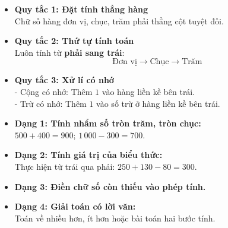 \documentclass[10pt,a4paper]{article}
\begin{document}
\noindent
\begin{minipage}[t]{0.49\textwidth}\vspace{0pt}
\begin{tcolorbox}[
  enhanced,
  colback=violet!4!white,
  colframe=violet!75!black,
  arc=2mm, boxrule=0.8pt,
  left=2mm, right=2mm, top=1.8mm, bottom=1.8mm,
  title={\footnotesize\bfseries\color{white}\faKey\ 1. Bảng quy tắc tính toán chuẩn mực}
]
{\footnotesize
\begin{itemize}\setlength{\itemsep}{1pt}\setlength{\leftskip}{-2.5mm}
  \item \textbf{Quy tắc 1: Đặt tính thẳng hàng}\\
  Chữ số hàng đơn vị, chục, trăm phải thẳng cột tuyệt đối.
  \item \textbf{Quy tắc 2: Thứ tự tính toán}\\
  Luôn tính từ \textbf{phải sang trái}:
  $$\text{Đơn vị} \longrightarrow \text{Chục} \longrightarrow \text{Trăm}$$
  \item \textbf{Quy tắc 3: Xử lí có nhớ}\\
  - Cộng có nhớ: Thêm $1$ vào hàng liền kề bên trái.\\
  - Trừ có nhớ: Thêm $1$ vào số trừ ở hàng liền kề bên trái.
\end{itemize}
}
\end{tcolorbox}
\end{minipage}
\hfill
\begin{minipage}[t]{0.49\textwidth}\vspace{0pt}
\begin{tcolorbox}[
  enhanced,
  colback=teal!4!white,
  colframe=teal!75!black,
  arc=2mm, boxrule=0.8pt,
  left=2mm, right=2mm, top=1.8mm, bottom=1.8mm,
  title={\footnotesize\bfseries\color{white}\faSliders\ 2. Các dạng toán trọng tâm học kì 2}
]
{\footnotesize
\begin{itemize}\setlength{\itemsep}{1pt}\setlength{\leftskip}{-2.5mm}
  \item \textbf{Dạng 1: Tính nhẩm số tròn trăm, tròn chục:}\\
  $500 + 400 = 900$; \quad $1\,000 - 300 = 700$.
  \item \textbf{Dạng 2: Tính giá trị của biểu thức:}\\
  Thực hiện từ trái qua phải: $250 + 130 - 80 = 300$.
  \item \textbf{Dạng 3: Điền chữ số còn thiếu vào phép tính.}\\
  \item \textbf{Dạng 4: Giải toán có lời văn:}\\
  Toán về nhiều hơn, ít hơn hoặc bài toán hai bước tính.
\end{itemize}
}
\end{tcolorbox}
\end{minipage}
\end{document}
